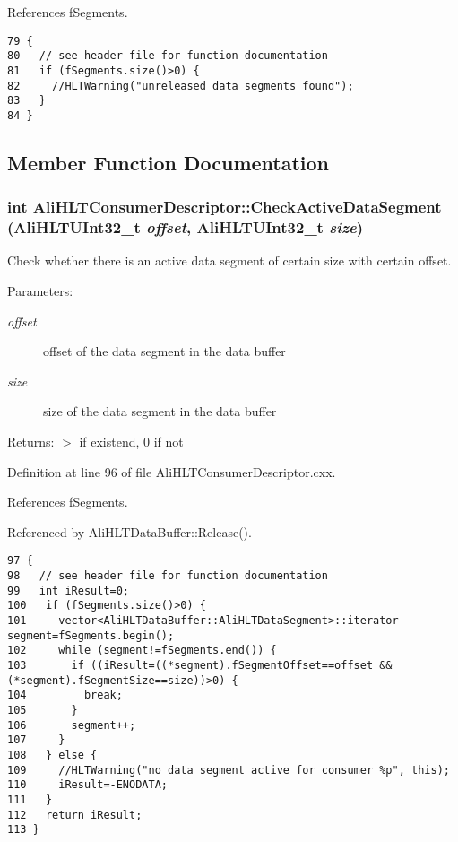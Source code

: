 References f\-Segments.

\footnotesize\begin{verbatim}79 {
80   // see header file for function documentation
81   if (fSegments.size()>0) {
82     //HLTWarning("unreleased data segments found");
83   }
84 }
\end{verbatim}\normalsize 




\subsection{Member Function Documentation}
\subsubsection{\setlength{\rightskip}{0pt plus 5cm}int Ali\-HLTConsumer\-Descriptor::Check\-Active\-Data\-Segment ({\bf Ali\-HLTUInt32\_\-t} {\em offset}, {\bf Ali\-HLTUInt32\_\-t} {\em size})}\label{classAliHLTConsumerDescriptor_a7}


Check whether there is an active data segment of certain size with certain offset. \begin{Desc}
\item[Parameters:]
\begin{description}
\item[{\em offset}]offset of the data segment in the data buffer \item[{\em size}]size of the data segment in the data buffer \end{description}
\end{Desc}
\begin{Desc}
\item[Returns:]$>$ if existend, 0 if not \end{Desc}


Definition at line 96 of file Ali\-HLTConsumer\-Descriptor.cxx.

References f\-Segments.

Referenced by Ali\-HLTData\-Buffer::Release().

\footnotesize\begin{verbatim}97 {
98   // see header file for function documentation
99   int iResult=0;
100   if (fSegments.size()>0) {
101     vector<AliHLTDataBuffer::AliHLTDataSegment>::iterator segment=fSegments.begin();
102     while (segment!=fSegments.end()) {
103       if ((iResult=((*segment).fSegmentOffset==offset && (*segment).fSegmentSize==size))>0) {
104         break;
105       }
106       segment++;
107     }
108   } else {
109     //HLTWarning("no data segment active for consumer %p", this);
110     iResult=-ENODATA;
111   }
112   return iResult;
113 }
\end{verbatim}\normalsize 


